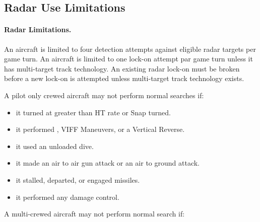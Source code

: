 \subsection{Radar Use Limitations}

\paragraph{Radar Limitations.} An aircraft is limited to four detection attempts against eligible radar targets per game turn. An aircraft is limited to one lock-on attempt par game turn unless it has multi-target track technology. An existing radar lock-on must be broken before a new lock-on is attempted unless multi-target track technology exists.

A pilot only crewed aircraft may not perform normal searches if:

\begin{itemize}

    \item it turned at greater than HT rate or Snap turned.

    \item it performed , VIFF Maneuvers, or a Vertical Reverse.

    \item it used an unloaded dive.

    \item it made an air to air gun attack or an air to ground attack.

    \item it stalled, departed, or engaged missiles.


    \item it performed any damage control.

    
\end{itemize}

A multi-crewed aircraft may not perform normal search if:

